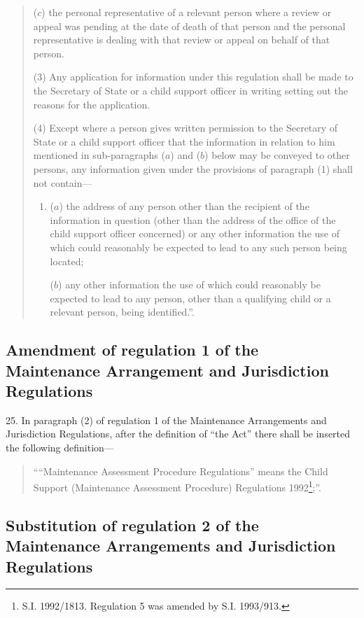 \documentclass[12pt,a4paper]{article}
\begin{document}
\begin{quotation}
\begin{enumerate}
($c$) the personal representative of a relevant person where a review or appeal was pending at the date of death of that person and the personal representative is dealing with that review or appeal on behalf of that person.
\end{enumerate}

(3) Any application for information under this regulation shall be made to the Secretary of State or a child support officer in writing setting out the reasons for the application.

(4) Except where a person gives written permission to the Secretary of State or a child support officer that the information in relation to him mentioned in sub-paragraphs ($a$) and ($b$) below may be conveyed to other persons, any information given under the provisions of paragraph (1) shall not contain—
\begin{enumerate}\item[]
($a$) the address of any person other than the recipient of the information in question (other than the address of the office of the child support officer concerned) or any other information the use of which could reasonably be expected to lead to any such person being located;

($b$) any other information the use of which could reasonably be expected to lead to any person, other than a qualifying child or a relevant person, being identified.”.
\end{enumerate}
\end{quotation}

\subsection[25. Amendment of regulation 1 of the Maintenance Arrangement and Jurisdiction Regulations]{Amendment of regulation 1 of the Maintenance Arrangement and Jurisdiction Regulations}

25.  In paragraph (2) of regulation 1 of the Maintenance Arrangements and Jurisdiction Regulations, after the definition of “the Act” there shall be inserted the following definition—
\begin{quotation}
““Maintenance Assessment Procedure Regulations” means the Child Support (Maintenance Assessment Procedure) Regulations 1992\footnote{\frenchspacing S.I. 1992/1813. Regulation 5 was amended by S.I. 1993/913.};”.
\end{quotation}

\subsection[26. Substitution of regulation 2 of the Maintenance Arrangements and Jurisdiction Regulations]{Substitution of regulation 2 of the Maintenance Arrangements and Jurisdiction Regulations}
\end{document}
